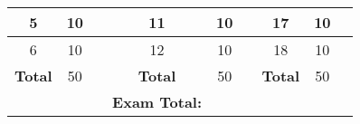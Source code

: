 \documentclass[12pt,letterpaper]{exam}
\begin{document}
{\begin{table}[!ht]
\begin{tabular}{ccccccccc}
	\multicolumn{1}{|c|}{\cellcolor[HTML]{C0C0C0}5} & \multicolumn{1}{c|}{10} & \multicolumn{1}{c|}{} & \multicolumn{1}{c|}{\cellcolor[HTML]{C0C0C0}11} & \multicolumn{1}{c|}{10} & \multicolumn{1}{c|}{} & \multicolumn{1}{c|}{\cellcolor[HTML]{C0C0C0}17} & \multicolumn{1}{c|}{10} & \multicolumn{1}{c|}{} \\ \hline

	\multicolumn{1}{|c|}{\cellcolor[HTML]{C0C0C0}6} & \multicolumn{1}{c|}{10} & \multicolumn{1}{c|}{} & \multicolumn{1}{c|}{\cellcolor[HTML]{C0C0C0}12} & \multicolumn{1}{c|}{10} & \multicolumn{1}{c|}{} & \multicolumn{1}{c|}{\cellcolor[HTML]{C0C0C0}18} & \multicolumn{1}{c|}{10} & \multicolumn{1}{c|}{} \\ \hline

	\multicolumn{1}{|c|}{\cellcolor[HTML]{C0C0C0}\textbf{Total}} & \multicolumn{1}{c|}{50} & \multicolumn{1}{c|}{} & \multicolumn{1}{c|}{\cellcolor[HTML]{C0C0C0}\textbf{Total}} & \multicolumn{1}{c|}{50} & \multicolumn{1}{c|}{} & \multicolumn{1}{c|}{\cellcolor[HTML]{C0C0C0}\textbf{Total}} & \multicolumn{1}{c|}{50} & \multicolumn{1}{c|}{} \\[0.2cm] \hline

&  &  & {\bfseries Exam Total:} & &  &  &  & 
\end{tabular}
\end{table}
}
\bottomline
\newpage
\end{document}

